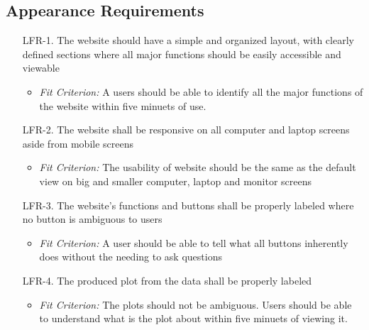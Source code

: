 \documentclass[12pt]{article}
\begin{document}
\subsection{Appearance Requirements}
\begin{enumerate}
  \item [LFR-1.]The website should have a simple and organized layout, with
  clearly defined sections where all major functions should be easily accessible
  and viewable 
  \begin{itemize}
    \item\textit{Fit Criterion:} A users should be able to identify all the major
    functions of the website within five minuets of use.
  \end{itemize}
  \item [LFR-2.] The website shall be responsive on all computer and laptop screens
  aside from mobile screens
  \begin{itemize}
    \item \textit{Fit Criterion:} The usability of website should be the same
    as the default view on big and smaller computer, laptop and monitor screens
  \end{itemize}
  \item [LFR-3.] The website's functions and buttons shall be properly labeled
  where no button is ambiguous to users 
  \begin{itemize}
    \item \textit{Fit Criterion:} A user should be able to tell what all buttons inherently does
    without the needing to ask questions
  \end{itemize}
  \item [LFR-4.]The produced plot from the data shall be properly labeled
  \begin{itemize}
    \item \textit{Fit Criterion:} The plots should not be ambiguous. Users should be able to understand
    what is the plot about within five minuets of viewing it.
  \end{itemize}
  \subitem
\end{enumerate}
\end{document}
